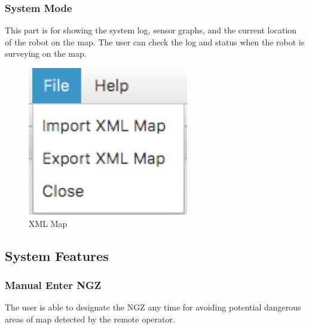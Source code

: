 \documentclass[10pt,a4paper,titlepage]{article}
\begin{document}
   
  \subsubsection{  System Mode} 
This part is for showing the system log, sensor graphs, and the current location of the robot on the map. The user can check the log and status when the robot is surveying on the map.
  \begin{figure}[H] 
  \includegraphics[width=\linewidth]{xml.png}  %
  \caption{XML Map} 
  \label{fig:XML Map}               
  \end{figure} 
  
 
 
  \subsection{System Features} 
   
  \subsubsection{Manual Enter NGZ} 
  The user is able to designate the NGZ any time for avoiding potential dangerous areas of map detected by the remote operator.
 
\end{document}
